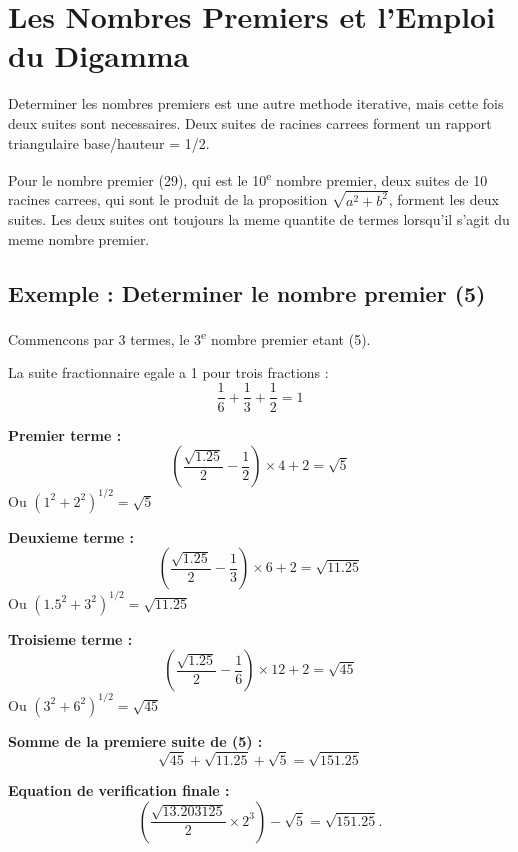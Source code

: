 \documentclass[a4paper,11pt]{article}
\newenvironment{mydef}[1]{%
    \begin{tcolorbox}[colback=blue!5,colframe=holblue,title={\textbf{Définition : #1}}]
}{%
    \end{tcolorbox}
}
\newenvironment{exemple}[1][]{%
    \begin{tcolorbox}[colback=green!5,colframe=holgreen,title={\textbf{Exemple #1}}]
}{%
    \end{tcolorbox}
}
\begin{document}
\newpage
\section{Les Nombres Premiers et l'Emploi du Digamma}

Determiner les nombres premiers est une autre methode iterative, mais cette fois deux suites sont necessaires. Deux suites de racines carrees forment un rapport triangulaire base/hauteur = 1/2.

\begin{mydef}{Suites pour les nombres premiers}
Pour le nombre premier (29), qui est le 10\textsuperscript{e} nombre premier, deux suites de 10 racines carrees, qui sont le produit de la proposition $\sqrt{a^2 + b^2}$, forment les deux suites. Les deux suites ont toujours la meme quantite de termes lorsqu'il s'agit du meme nombre premier.
\end{mydef}

\subsection{Exemple : Determiner le nombre premier (5)}

Commencons par 3 termes, le 3\textsuperscript{e} nombre premier etant (5).

La suite fractionnaire egale a 1 pour trois fractions :
\[
\frac{1}{6} + \frac{1}{3} + \frac{1}{2} = 1
\]

\begin{exemple}[: Calcul de la premiere suite pour (5)]
\textbf{Premier terme :}
\[
\left(\frac{\sqrt{1.25}}{2} - \frac{1}{2}\right) \times 4 + 2 = \sqrt{5}
\]
Ou $(1^2 + 2^2)^{1/2} = \sqrt{5}$

\textbf{Deuxieme terme :}
\[
\left(\frac{\sqrt{1.25}}{2} - \frac{1}{3}\right) \times 6 + 2 = \sqrt{11.25}
\]
Ou $(1.5^2 + 3^2)^{1/2} = \sqrt{11.25}$

\textbf{Troisieme terme :}
\[
\left(\frac{\sqrt{1.25}}{2} - \frac{1}{6}\right) \times 12 + 2 = \sqrt{45}
\]
Ou $(3^2 + 6^2)^{1/2} = \sqrt{45}$

\textbf{Somme de la premiere suite de (5) :}
\[
\sqrt{45} + \sqrt{11.25} + \sqrt{5} = \sqrt{151.25}
\]

\textbf{Equation de verification finale :}
\[
\left( \frac{\sqrt{13.203125}}{2} \times 2^{3} \right) - \sqrt{5}
= \sqrt{151.25}.
\]
\end{exemple}
\end{document}
